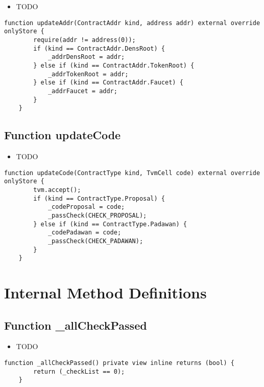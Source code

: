 \begin{itemize}
\item TODO
\end{itemize}

\begin{lstlisting}[firstnumber=174]
    function updateAddr(ContractAddr kind, address addr) external override onlyStore {
        require(addr != address(0));
        if (kind == ContractAddr.DensRoot) {
            _addrDensRoot = addr;
        } else if (kind == ContractAddr.TokenRoot) {
            _addrTokenRoot = addr;
        } else if (kind == ContractAddr.Faucet) {
            _addrFaucet = addr;
        }
    }
\end{lstlisting}

\subsection{Function updateCode}

\begin{itemize}
\item TODO
\end{itemize}

\begin{lstlisting}[firstnumber=185]
    function updateCode(ContractType kind, TvmCell code) external override onlyStore {
        tvm.accept();
        if (kind == ContractType.Proposal) {
            _codeProposal = code;
            _passCheck(CHECK_PROPOSAL);
        } else if (kind == ContractType.Padawan) {
            _codePadawan = code;
            _passCheck(CHECK_PADAWAN);
        }
    }
\end{lstlisting}

\section{Internal Method Definitions}


\subsection{Function \_{}allCheckPassed}

\begin{itemize}
\item TODO
\end{itemize}

\begin{lstlisting}[firstnumber=62]
    function _allCheckPassed() private view inline returns (bool) {
        return (_checkList == 0);
    }
\end{lstlisting}

